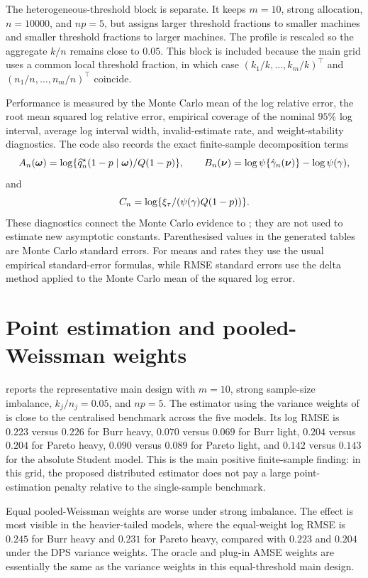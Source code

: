 The heterogeneous-threshold block is separate. It keeps \(m=10\), strong
allocation, \(n=10000\), and \(np=5\), but assigns larger threshold fractions
to smaller machines and smaller threshold fractions to larger machines. The
profile is rescaled so the aggregate \(k/n\) remains close to \(0.05\). This
block is included because the main grid uses a common local threshold
fraction, in which case \((k_1/k,\ldots,k_m/k)^\top\) and
\((n_1/n,\ldots,n_m/n)^\top\) coincide.

Performance is measured by the Monte Carlo mean of the log relative error,
the root mean squared log relative error, empirical coverage of the nominal
\(95\%\) log interval, average log interval width, invalid-estimate rate, and
weight-stability diagnostics. The code also records the exact finite-sample
decomposition terms
\[
  A_n(\bm\omega)
  =
  \log\{\widehat{q}^{\star}_n(1-p\mid\bm\omega)/Q(1-p)\},
  \qquad
  B_n(\bm\nu)
  =
  \log\psi\{\hat\gamma_n(\bm\nu)\}-\log\psi(\gamma),
\]
and
\[
  C_n
  =
  \log\{\xi_\tau/(\psi(\gamma)Q(1-p))\}.
\]
These diagnostics connect the Monte Carlo evidence to
; they are not used to estimate new
asymptotic constants. Parenthesised values in the generated tables are Monte
Carlo standard errors. For means and rates they use the usual empirical
standard-error formulas, while RMSE standard errors use the delta method
applied to the Monte Carlo mean of the squared log error.

\section{Point estimation and pooled-Weissman weights}
\label{sec:sim:point}

 reports the representative main design with
\(m=10\), strong sample-size imbalance, \(k_j/n_j=0.05\), and \(np=5\). The
estimator using the variance weights of \textcite{DaouiaPadoanStupfler2021}
is close to the centralised benchmark across the five models. Its log RMSE is
\(0.223\) versus \(0.226\) for Burr heavy, \(0.070\) versus \(0.069\) for
Burr light, \(0.204\) versus \(0.204\) for Pareto heavy, \(0.090\) versus
\(0.089\) for Pareto light, and \(0.142\) versus \(0.143\) for the absolute
Student model.
This is the main positive finite-sample finding: in this grid, the proposed
distributed estimator does not pay a large point-estimation penalty relative to
the single-sample benchmark.

Equal pooled-Weissman weights are worse under strong imbalance. The effect is
most visible in the heavier-tailed models, where the equal-weight log RMSE is
\(0.245\) for Burr heavy and \(0.231\) for Pareto heavy, compared with
\(0.223\) and \(0.204\) under the DPS variance weights. The
oracle and plug-in AMSE weights are essentially the same as the variance
weights in this equal-threshold main design.

